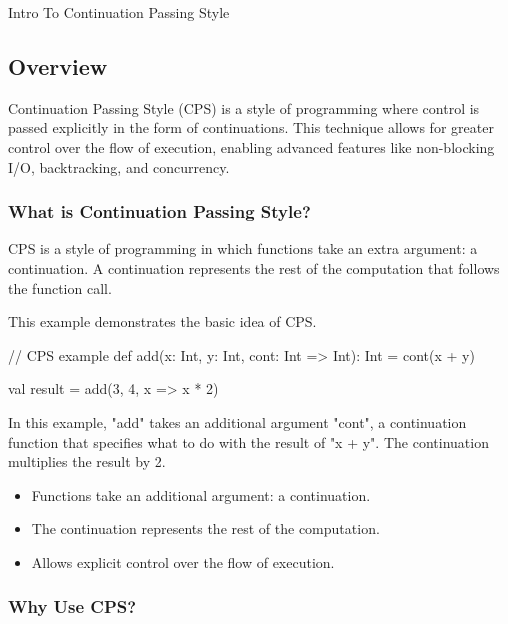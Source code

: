 \begin{notes}{Intro To Continuation Passing Style}
    \subsection*{Overview}

    Continuation Passing Style (CPS) is a style of programming where control is passed explicitly in the form of continuations. This technique allows for greater control over the flow of execution, 
    enabling advanced features like non-blocking I/O, backtracking, and concurrency.
    
    \subsubsection*{What is Continuation Passing Style?}
    
    CPS is a style of programming in which functions take an extra argument: a continuation. A continuation represents the rest of the computation that follows the function call.
    
    \begin{highlight}
    
        This example demonstrates the basic idea of CPS.
    
    \begin{code}[Scala]
    // CPS example
    def add(x: Int, y: Int, cont: Int => Int): Int = cont(x + y)
    
    val result = add(3, 4, x => x * 2)
    \end{code}
    
        In this example, "add" takes an additional argument "cont", a continuation function that specifies what to do with the result of "x + y". The continuation multiplies the result by 2.
    
        \begin{itemize}
            \item Functions take an additional argument: a continuation.
            \item The continuation represents the rest of the computation.
            \item Allows explicit control over the flow of execution.
        \end{itemize}
    
    \end{highlight}
    
    \subsubsection*{Why Use CPS?}
    

\end{notes}
